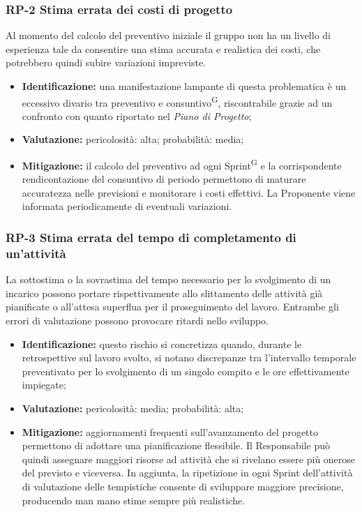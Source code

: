 \documentclass[8pt]{article}
\newcommand{\glossterm}[1]{#1\textsuperscript{G}} %
\begin{document}
\subsubsection{RP-2 Stima errata dei costi di progetto}
Al momento del calcolo del preventivo iniziale il gruppo non ha un livello di esperienza tale da consentire una stima accurata e realistica dei costi, che potrebbero quindi subire variazioni impreviste.
\begin{itemize}
\setlength\itemsep{0em}
    \item \textbf{Identificazione:} una manifestazione lampante di questa problematica è un eccessivo divario tra preventivo e \glossterm{consuntivo}, riscontrabile grazie ad un confronto con quanto riportato nel \textit{Piano di Progetto};
    \item \textbf{Valutazione:} pericolosità: alta; probabilità: media;
    \item \textbf{Mitigazione:} il calcolo del preventivo ad ogni \glossterm{Sprint} e la corrispondente rendicontazione del consuntivo di periodo permettono di maturare accuratezza nelle previsioni e monitorare i costi effettivi. La Proponente viene informata periodicamente di eventuali variazioni.
\end{itemize}

\subsubsection{RP-3 Stima errata del tempo di completamento di un'attività}
La sottostima o la sovrastima del tempo necessario per lo svolgimento di un incarico possono portare rispettivamente allo slittamento delle attività già pianificate o all'attesa superflua per il proseguimento del lavoro. Entrambe gli errori di valutazione possono provocare ritardi nello sviluppo.
\begin{itemize}
\setlength\itemsep{0em}
    \item \textbf{Identificazione:} questo rischio si concretizza quando, durante le retrospettive sul lavoro svolto, si notano discrepanze tra l'intervallo temporale preventivato per lo svolgimento di un singolo compito e le ore effettivamente impiegate;
    \item \textbf{Valutazione:} pericolosità: media; probabilità: alta;
    \item \textbf{Mitigazione:} aggiornamenti frequenti sull'avanzamento del progetto permettono di adottare una pianificazione flessibile. Il Responsabile può quindi assegnare maggiori risorse ad attività che si rivelano essere più onerose del previsto e viceversa. In aggiunta, la ripetizione in ogni Sprint dell'attività di valutazione delle tempistiche consente di sviluppare maggiore precisione, producendo man mano stime sempre più realistiche.
\end{itemize}
\end{document}
